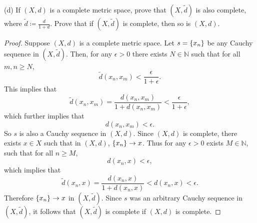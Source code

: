 \documentclass{article}
\newcommand{\N}{\mathbb{N}}
\begin{document}
(d) If $(X, d)$ is a complete metric space, prove that $(X, \tilde{d})$
is also complete, where $\tilde{d} \coloneqq \frac{d}{1 + d}$. Prove
that if $(X, \tilde{d})$ is complete, then so is $(X, d)$.

\begin{proof}

Suppose $(X, d)$ is a complete metric space. Let $s = \cbr{x_n}$ be any
Cauchy sequence in $(X, \tilde{d})$. Then, for any $\epsilon > 0$
there exists $N \in \N$ such that for all $m, n \geq N$,
%
\begin{equation*}
    \tilde{d}(x_n, x_m) < \frac{\epsilon}{1 + \epsilon}
    .
\end{equation*}
%
This implies that
%
\begin{equation*}
    \tilde{d}(x_n, x_m)
        = \frac{d(x_n, x_m)}{1 + d(x_n, x_m)}
        < \frac{\epsilon}{1 + \epsilon}
        ,
\end{equation*}
%
which further implies that
%
\begin{equation*}
    d(x_n, x_m) < \epsilon
    .
\end{equation*}
%
So $s$ is also a Cauchy sequence in $(X, d)$. Since $(X, d)$ is
complete, there exists $x \in X$ such that in $(X, d)$, $\cbr{x_n} \to
x$. Thus for any $\epsilon > 0$ exists $M \in \N$, such that for
all $n \geq M$,
%
\begin{equation*}
    d(x_n, x) < \epsilon
    ,
\end{equation*}
%
which implies that
%
\begin{equation*}
    \tilde{d}(x_n, x)
        = \frac{d(x_n, x)}{1 + d(x_n, x)} < d(x_n, x) < \epsilon
    .
\end{equation*}
%
Therefore $\cbr{x_n} \to x$ in $(X, \tilde{d})$. Since $s$ was an
arbitrary Cauchy sequence in $(X, \tilde{d})$, it follows that $(X,
\tilde{d})$ is complete if $(X, d)$ is complete.


\end{proof}
\end{document}
